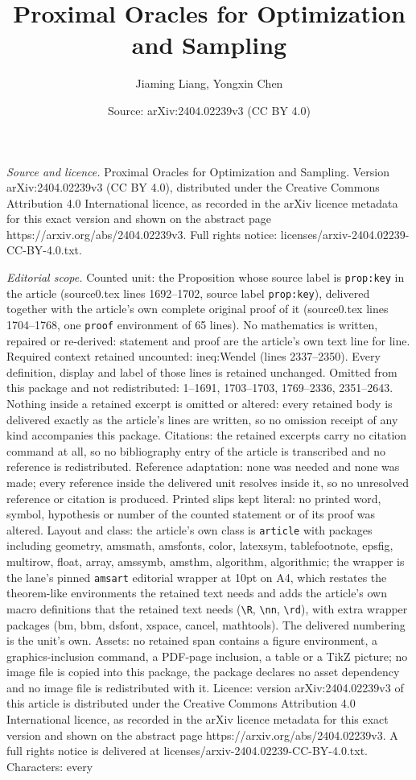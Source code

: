 \documentclass[10pt,a4paper]{amsart}
\title[Proximal Oracles for Optimization and Sampling]{Proximal Oracles for Optimization and Sampling}
\author{Jiaming Liang, Yongxin Chen}
\date{Source: arXiv:2404.02239v3 (CC BY 4.0)}
\begin{document}
\maketitle

\noindent\emph{Source and licence.} Proximal Oracles for Optimization and Sampling. Version arXiv:2404.02239v3 (CC BY 4.0), distributed under the Creative Commons Attribution 4.0 International licence, as recorded in the arXiv licence metadata for this exact version and shown on the abstract page https://arxiv.org/abs/2404.02239v3. Full rights notice: licenses/arxiv-2404.02239-CC-BY-4.0.txt.\par\smallskip

\noindent\textit{Editorial scope.} Counted unit: the Proposition whose source label is \texttt{prop:key} in the article (source0.tex lines 1692--1702, source label \texttt{prop:key}), delivered together with the article's own complete original proof of it (source0.tex lines 1704--1768, one \texttt{proof} environment of 65 lines). No mathematics is written, repaired or re-derived: statement and proof are the article's own text line for line. Required context retained uncounted: ineq:Wendel (lines 2337--2350). Every definition, display and label of those lines is retained unchanged. Omitted from this package and not redistributed: 1--1691, 1703--1703, 1769--2336, 2351--2643. Nothing inside a retained excerpt is omitted or altered: every retained body is delivered exactly as the article's lines are written, so no omission receipt of any kind accompanies this package. Citations: the retained excerpts carry no citation command at all, so no bibliography entry of the article is transcribed and no reference is redistributed. Reference adaptation: none was needed and none was made; every reference inside the delivered unit resolves inside it, so no unresolved reference or citation is produced. Printed slips kept literal: no printed word, symbol, hypothesis or number of the counted statement or of its proof was altered. Layout and class: the article's own class is \texttt{article} with packages including geometry, amsmath, amsfonts, color, latexsym, tablefootnote, epsfig, multirow, float, array, amssymb, amsthm, algorithm, algorithmic; the wrapper is the lane's pinned \texttt{amsart} editorial wrapper at 10pt on A4, which restates the theorem-like environments the retained text needs and adds the article's own macro definitions that the retained text needs (\texttt{\textbackslash R}, \texttt{\textbackslash nn}, \texttt{\textbackslash rd}), with extra wrapper packages (bm, bbm, dsfont, xspace, cancel, mathtools). The delivered numbering is the unit's own. Assets: no retained span contains a figure environment, a graphics-inclusion command, a PDF-page inclusion, a table or a TikZ picture; no image file is copied into this package, the package declares no asset dependency and no image file is redistributed with it. Licence: version arXiv:2404.02239v3 of this article is distributed under the Creative Commons Attribution 4.0 International licence, as recorded in the arXiv licence metadata for this exact version and shown on the abstract page https://arxiv.org/abs/2404.02239v3. A full rights notice is delivered at licenses/arxiv-2404.02239-CC-BY-4.0.txt. Characters: every 
\end{document}
